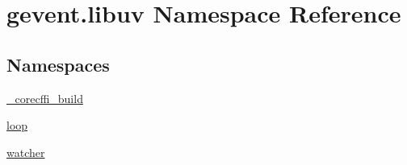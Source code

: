 \hypertarget{namespacegevent_1_1libuv}{}\section{gevent.\+libuv Namespace Reference}
\label{namespacegevent_1_1libuv}
\subsection*{Namespaces}
\begin{DoxyCompactItemize}
\item 
 \hyperlink{namespacegevent_1_1libuv_1_1__corecffi__build}{\+\_\+corecffi\+\_\+build}
\item 
 \hyperlink{namespacegevent_1_1libuv_1_1loop}{loop}
\item 
 \hyperlink{namespacegevent_1_1libuv_1_1watcher}{watcher}
\end{DoxyCompactItemize}
